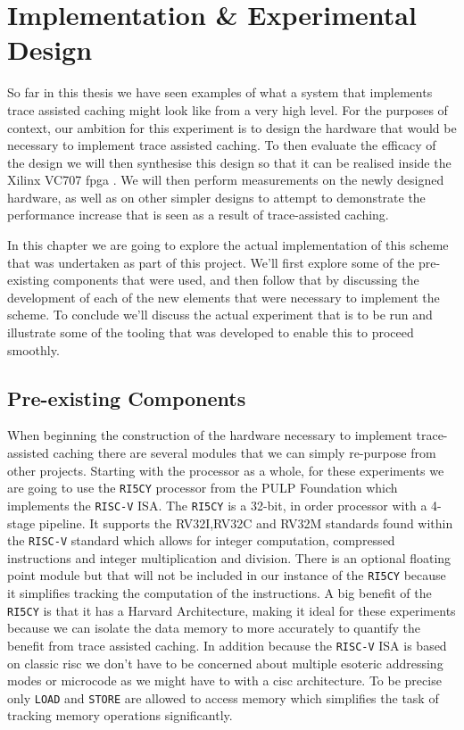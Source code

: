 \chapter{Implementation \& Experimental Design}
\label{chap:experimental-design}

So far in this thesis we have seen examples of what a system that implements trace assisted caching might look like from a very high level. For the purposes of context, our ambition for this experiment is to design the hardware that would be necessary to implement trace assisted caching. To then evaluate the efficacy of the design we will then synthesise this design so that it can be realised inside the Xilinx VC707 \gls{fpga} \cite{UG885VC707Evaluation2019}. We will then perform measurements on the newly designed hardware, as well as on other simpler designs to attempt to demonstrate the performance increase that is seen as a result of trace-assisted caching. 

In this chapter we are going to explore the actual implementation of this scheme that was undertaken as part of this project. We'll first explore some of the pre-existing components that were used, and then follow that by discussing the development of each of the new elements that were necessary to implement the scheme. To conclude we'll discuss the actual experiment that is to be run and illustrate some of the tooling that was developed to enable this to proceed smoothly.

\section{Pre-existing Components}

When beginning the construction of the hardware necessary to implement trace-assisted caching there are several modules that we can simply re-purpose from other projects. Starting with the processor as a whole, for these experiments we are going to use the \texttt{RI5CY}\cite{gautschiNearThresholdRISCVCore2017} processor from the PULP Foundation which implements the \texttt{RISC-V} ISA. The \texttt{RI5CY} is a 32-bit, in order processor with a 4-stage pipeline. It supports the RV32I,RV32C and RV32M standards found within the \texttt{RISC-V} standard which allows for integer computation, compressed instructions and integer multiplication and division. There is an optional floating point module but that will not be included in our instance of the \texttt{RI5CY} because it simplifies tracking the computation of the instructions. A big benefit of the \texttt{RI5CY} is that it has a Harvard Architecture, making it ideal for these experiments because we can isolate the data memory to more accurately to quantify the benefit from trace assisted caching. In addition because the \texttt{RISC-V} ISA is based on classic \gls{risc} we don't have to be concerned about multiple esoteric addressing modes or microcode as we might have to with a \gls{cisc} architecture. To be precise only \texttt{LOAD} and \texttt{STORE} are allowed to access memory which simplifies the task of tracking memory operations significantly.


